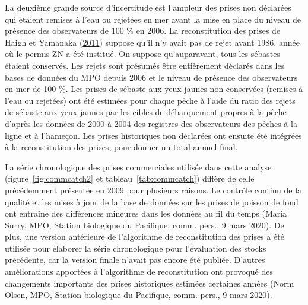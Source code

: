 \documentclass[french,11pt]{book}
\begin{document}
La deuxième grande source d'incertitude est l'ampleur des prises non déclarées qui étaient remises à l'eau ou rejetées en mer avant la mise en place du niveau de présence des observateurs de 100 \% en 2006. La reconstitution des prises de Haigh et Yamanaka (\protect\hyperlink{ref-haigh2011}{2011}) suppose qu'il n'y avait pas de rejet avant 1986, année où le permis ZN a été institué. On suppose qu'auparavant, tous les sébastes étaient conservés. Les rejets sont présumés être entièrement déclarés dans les bases de données du MPO depuis 2006 et le niveau de présence des observateurs en mer de 100 \%. Les prises de sébaste aux yeux jaunes non conservées (remises à l'eau ou rejetées) ont été estimées pour chaque pêche à l'aide du ratio des rejets de sébaste aux yeux jaunes par les cibles de débarquement propres à la pêche d'après les données de 2000 à 2004 des registres des observateurs des pêches à la ligne et à l'hameçon. Les prises historiques non déclarées ont ensuite été intégrées à la reconstitution des prises, pour donner un total annuel final.

La série chronologique des prises commerciales utilisée dans cette analyse (figure~\ref{fig:commcatch2} et tableau~\ref{tab:commcatch}) diffère de celle précédemment présentée en 2009 pour plusieurs raisons. Le contrôle continu de la qualité et les mises à jour de la base de données sur les prises de poisson de fond ont entraîné des différences mineures dans les données au fil du temps (Maria Surry, MPO, Station biologique du Pacifique, comm. pers., 9 mars 2020). De plus, une version antérieure de l'algorithme de reconstitution des prises a été utilisée pour élaborer la série chronologique pour l'évaluation des stocks précédente, car la version finale n'avait pas encore été publiée. D'autres améliorations apportées à l'algorithme de reconstitution ont provoqué des changements importants des prises historiques estimées certaines années (Norm Olsen, MPO, Station biologique du Pacifique, comm. pers., 9 mars 2020).
\end{document}
